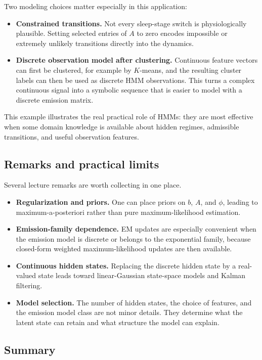 Two modeling choices matter especially in this application:
\begin{itemize}
  \item \textbf{Constrained transitions.} Not every sleep-stage switch is physiologically plausible. Setting selected entries of $A$ to zero encodes impossible or extremely unlikely transitions directly into the dynamics.
  \item \textbf{Discrete observation model after clustering.} Continuous feature vectors can first be clustered, for example by $K$-means, and the resulting cluster labels can then be used as discrete HMM observations. This turns a complex continuous signal into a symbolic sequence that is easier to model with a discrete emission matrix.
\end{itemize}

This example illustrates the real practical role of HMMs: they are most effective when some domain knowledge is available about hidden regimes, admissible transitions, and useful observation features.

\subsection{Remarks and practical limits}

Several lecture remarks are worth collecting in one place.
\begin{itemize}
  \item \textbf{Regularization and priors.} One can place priors on $b$, $A$, and $\phi$, leading to maximum-a-posteriori rather than pure maximum-likelihood estimation.
  \item \textbf{Emission-family dependence.} EM updates are especially convenient when the emission model is discrete or belongs to the exponential family, because closed-form weighted maximum-likelihood updates are then available.
  \item \textbf{Continuous hidden states.} Replacing the discrete hidden state by a real-valued state leads toward linear-Gaussian state-space models and Kalman filtering.
  \item \textbf{Model selection.} The number of hidden states, the choice of features, and the emission model class are not minor details. They determine what the latent state can retain and what structure the model can explain.
\end{itemize}

\subsection{Summary}

